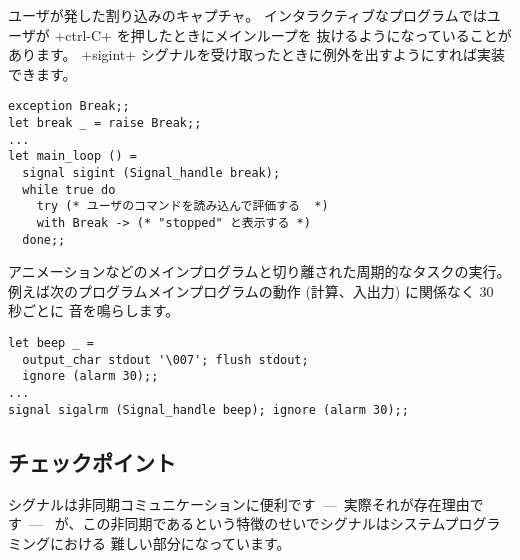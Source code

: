 \begin{example}
ユーザが発した割り込みのキャプチャ。
インタラクティブなプログラムではユーザが \ml+ctrl-C+ を押したときにメインループを
抜けるようになっていることがあります。
\ml+sigint+ シグナルを受け取ったときに例外を出すようにすれば実装できます。
%
\begin{lstlisting}
exception Break;;
let break _ = raise Break;;
...
let main_loop () =
  signal sigint (Signal_handle break);
  while true do
    try (* ユーザのコマンドを読み込んで評価する  *)
    with Break -> (* "stopped" と表示する *)
  done;;
\end{lstlisting}
\end{example}

\begin{example}
\label{ex/beep}
アニメーションなどのメインプログラムと切り離された周期的なタスクの実行。
例えば次のプログラムメインプログラムの動作 (計算、入出力) に関係なく 30 秒ごとに  音を鳴らします。

\begin{lstlisting}
let beep _ =
  output_char stdout '\007'; flush stdout;
  ignore (alarm 30);;
...
signal sigalrm (Signal_handle beep); ignore (alarm 30);;
\end{lstlisting}
\end{example}

\subsection*{チェックポイント}

シグナルは非同期コミュニケーションに便利です~---~実際それが存在理由です~---~
が、この非同期であるという特徴のせいでシグナルはシステムプログラミングにおける
難しい部分になっています。

